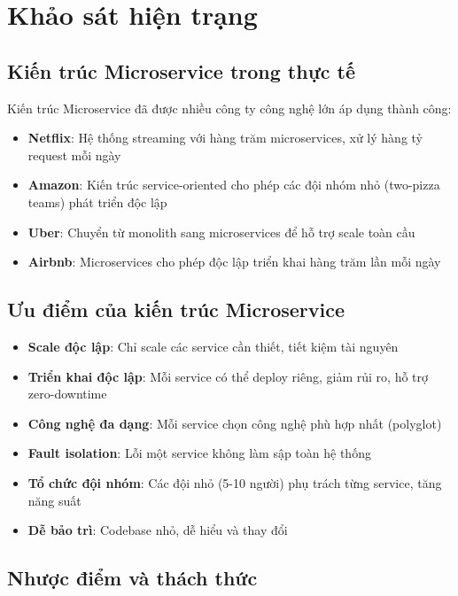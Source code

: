 \documentclass[12pt]{extreport}
\begin{document}
\section{Khảo sát hiện trạng}

\subsection{Kiến trúc Microservice trong thực tế}

Kiến trúc Microservice đã được nhiều công ty công nghệ lớn áp dụng thành công:

\begin{itemize}
    \item \textbf{Netflix}: Hệ thống streaming với hàng trăm microservices, xử lý hàng tỷ request mỗi ngày
    \item \textbf{Amazon}: Kiến trúc service-oriented cho phép các đội nhóm nhỏ (two-pizza teams) phát triển độc lập
    \item \textbf{Uber}: Chuyển từ monolith sang microservices để hỗ trợ scale toàn cầu
    \item \textbf{Airbnb}: Microservices cho phép độc lập triển khai hàng trăm lần mỗi ngày
\end{itemize}

\subsection{Ưu điểm của kiến trúc Microservice}

\begin{itemize}
    \item \textbf{Scale độc lập}: Chỉ scale các service cần thiết, tiết kiệm tài nguyên
    \item \textbf{Triển khai độc lập}: Mỗi service có thể deploy riêng, giảm rủi ro, hỗ trợ zero-downtime
    \item \textbf{Công nghệ đa dạng}: Mỗi service chọn công nghệ phù hợp nhất (polyglot)
    \item \textbf{Fault isolation}: Lỗi một service không làm sập toàn hệ thống
    \item \textbf{Tổ chức đội nhóm}: Các đội nhỏ (5-10 người) phụ trách từng service, tăng năng suất
    \item \textbf{Dễ bảo trì}: Codebase nhỏ, dễ hiểu và thay đổi
\end{itemize}

\subsection{Nhược điểm và thách thức}
\end{document}
